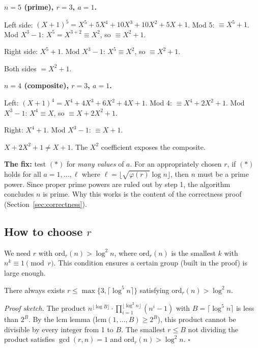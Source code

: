 \documentclass[12pt]{article}
\newcommand{\ord}{\mathrm{ord}}
\newcommand{\xmark}{\ding{55}}
\begin{document}
\begin{exbox}
\textbf{$n=5$ (prime), $r=3$, $a=1$.}

Left side: $(X+1)^5 = X^5+5X^4+10X^3+10X^2+5X+1$. Mod 5: $\equiv X^5+1$. Mod $X^3-1$: $X^5=X^{3+2}\equiv X^2$, so $\equiv X^2+1$.

Right side: $X^5+1$. Mod $X^3-1$: $X^5\equiv X^2$, so $\equiv X^2+1$.

Both sides $= X^2+1$. \checkmark

\medskip\textbf{$n=4$ (composite), $r=3$, $a=1$.}

Left: $(X+1)^4=X^4+4X^3+6X^2+4X+1$. Mod 4: $\equiv X^4+2X^2+1$. Mod $X^3-1$: $X^4\equiv X$, so $\equiv X+2X^2+1$.

Right: $X^4+1$. Mod $X^3-1$: $\equiv X+1$.

$X+2X^2+1 \neq X+1$. The $X^2$ coefficient exposes the composite. \xmark
\end{exbox}

\textbf{The fix:} test $(*)$ for \emph{many values} of $a$. For an appropriately chosen $r$, if $(*)$ holds for all $a = 1,\ldots,\ell$ where $\ell = \lfloor\sqrt{\varphi(r)}\log n\rfloor$, then $n$ must be a prime power. Since proper prime powers are ruled out by step 1, the algorithm concludes $n$ is prime. Why this works is the content of the correctness proof (Section~\ref{sec:correctness}).

\subsection{How to choose $r$}

We need $r$ with $\ord_r(n) > \log^2 n$, where $\ord_r(n)$ is the smallest $k$ with $n^k \equiv 1 \pmod{r}$. This condition ensures a certain group (built in the proof) is large enough.

\begin{thmbox}[Lemma 4.3]
There always exists $r \leq \max\{3,\lceil\log^5 n\rceil\}$ satisfying $\ord_r(n)>\log^2 n$.
\end{thmbox}

\textit{Proof sketch.} The product $n^{\lfloor\log B\rfloor}\cdot\prod_{i=1}^{\lfloor\log^2 n\rfloor}(n^i-1)$ with $B=\lceil\log^5 n\rceil$ is less than $2^B$. By the lcm lemma ($\mathrm{lcm}(1,\ldots,B)\geq 2^B$), this product cannot be divisible by every integer from 1 to $B$. The smallest $r\leq B$ not dividing the product satisfies $\gcd(r,n)=1$ and $\ord_r(n)>\log^2 n$. $\square$
\end{document}
